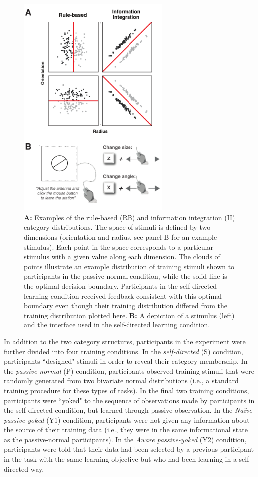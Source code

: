 \documentclass[3p,twocolumn,authoryear,10pt]{elsarticle}
\begin{document}
 \begin{figure}[t]
\centerline{\includegraphics[width=2.9in]{figures/taskdesign.pdf}}
\caption{\textbf{A:} Examples of the rule-based (RB) and information integration (II) category distributions.  The space of stimuli is defined by two dimensions (orientation and radius, see panel B for an example stimulus).  Each point in the space corresponds to a particular stimulus with a given value along each dimension.  The clouds of points illustrate an example distribution of training stimuli shown to participants in the passive-normal condition, while the solid line is the optimal decision boundary. Participants in the self-directed learning condition received feedback consistent with this optimal boundary even though their training distribution differed from the training distribution plotted here.  \textbf{B:} A depiction of a stimulus (left) and the interface used in the self-directed learning condition.}
\label{design.fig}
\end{figure}


In addition to the two category structures, participants in the experiment were further divided into four training conditions. In the \textit{self-directed} (S) condition, participants ``designed" stimuli in order to reveal their category membership. In the \textit{passive-normal} (P) condition, participants observed training stimuli that were randomly generated from two bivariate normal distributions (i.e., a standard training procedure for these types of tasks).
  In the final two training conditions, participants were ``yoked" to the sequence of observations made by participants in the self-directed condition, but learned through passive observation. In the \textit{Na\"ive passive-yoked} (Y1) condition, participants were not given any information about the source of their training data (i.e., they were in the same informational state as the passive-normal participants). In the \textit{Aware passive-yoked} (Y2) condition, participants were told that their data had been selected by a previous participant  in the task with the same learning objective but who had been learning in a self-directed way.
\end{document}
